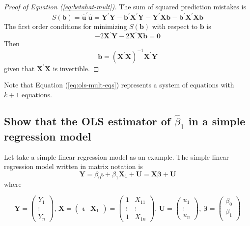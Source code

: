 \documentclass[a4paper,11pt]{article}
\begin{document}
\begin{proof}[Proof of Equation (\ref{eq:betahat-mult})]
The sum of squared prediction mistakes is
\begin{equation*}
S(\mathbf{b}) = \hat{\mathbf{u}}^{\prime} \hat{\mathbf{u}} = \mathbf{Y}^{\prime} \mathbf{Y} - \mathbf{b}^{\prime} \mathbf{X}^{\prime} \mathbf{Y} - \mathbf{Y}^{\prime} \mathbf{Xb} - \mathbf{b}^{\prime} \mathbf{X}^{\prime} \mathbf{Xb}
\end{equation*}
The first order conditions for minimizing $S(\mathbf{b})$ with respect to $\mathbf{b}$ is
\begin{equation}
\label{eq:ols-mult-eqs}
-2 \mathbf{X}^{\prime} \mathbf{Y} - 2 \mathbf{X}^{\prime} \mathbf{Xb} = \mathbf{0}
\end{equation}
Then
\begin{equation*}
\mathbf{b} = (\mathbf{X}^{\prime} \mathbf{X})^{-1} \mathbf{X}^{\prime} \mathbf{Y}
\end{equation*}
given that $\mathbf{X}^{\prime} \mathbf{X}$ is invertible.
\end{proof}

Note that Equation (\ref{eq:ols-mult-eqs}) represents a system of
equations with \(k+1\) equations.

\subsection{Show that the OLS estimator of \(\hat{\beta}_1\) in a simple regression model}
\label{sec:org2db3f7c}
Let take a simple linear regression model as an example. The simple
linear regression model written in matrix notation is
\begin{equation*}
\mathbf{Y} = \beta_0 \boldsymbol{\iota} + \beta_1 \mathbf{X}_1 + \mathbf{U} = \mathbf{X} \boldsymbol{\beta} + \mathbf{U}
\end{equation*}
where

\begin{equation*}
\mathbf{Y} =
\begin{pmatrix}
Y_1 \\
\vdots \\
Y_n
\end{pmatrix},\,
\mathbf{X} =
\begin{pmatrix}
\boldsymbol{\iota} & \mathbf{X}_1
\end{pmatrix}
=
\begin{pmatrix}
1 & X_{11} \\
\vdots & \vdots \\
1 & X_{1n}
\end{pmatrix},\,
\mathbf{U} =
\begin{pmatrix}
u_1 \\
\vdots \\
u_n
\end{pmatrix},\,
\boldsymbol{\beta} =
\begin{pmatrix}
\beta_0 \\
\beta_1 \\
\end{pmatrix}
\end{equation*}
\end{document}
